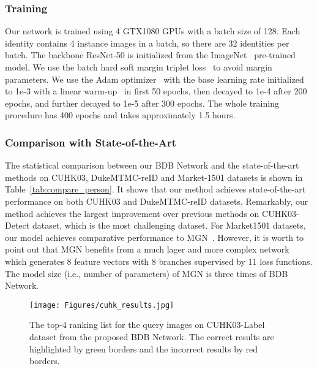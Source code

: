 \subsubsection{Training}\vspace{-1mm}
Our network is trained using 4 GTX1080 GPUs with a batch size of 128. 
Each identity contains 4 instance images in a batch, so there are 32 identities per batch. 
The backbone ResNet-50 is initialized from the ImageNet~\cite{deng2009imagenet} pre-trained model. 
We use the batch hard soft margin triplet loss~\cite{hermans2017defense} to avoid margin parameters.
We use the Adam optimizer~\cite{kingma2014adame} with the base learning rate initialized to 1e-3 with a linear warm-up~\cite{goyal2017accurate} in first 50 epochs, then decayed to 1e-4 after 200 epochs, and further decayed to 1e-5 after 300 epochs. The whole training procedure has 400 epochs and takes approximately 1.5 hours. 
\vspace{-3mm}
\subsubsection{Comparison with State-of-the-Art}\vspace{-1mm}
The statistical comparison between our BDB Network and the state-of-the-art methods on CUHK03, DukeMTMC-reID and Market-1501 datasets is shown in Table~\ref{tab:compare_person}. It shows that our method achieves state-of-the-art performance on both CUHK03 and DukeMTMC-reID datasets. Remarkably, our method achieves the largest improvement over previous methods on CUHK03-Detect dataset, which is the most challenging dataset. For Market1501 datasets, our model achieves comparative performance to MGN~\cite{wang2018mgn}. However, it is worth to point out that MGN benefits from a much lager and more complex network which generates 8 feature vectors with 8 branches supervised by 11 loss functions. 
The model size (i.e., number of parameters) of MGN is three times of BDB Network.

\begin{figure}[t]
\begin{center}
\texttt{[image: Figures/cuhk\_results.jpg]}
\end{center}\vspace{-3mm}
\caption{The top-4 ranking list for the query images on CUHK03-Label dataset from the proposed BDB Network. 
The correct results are highlighted by green borders and the incorrect results by red borders.}
\label{fig:cuhk_results}
\vspace{3mm}
\end{figure}

